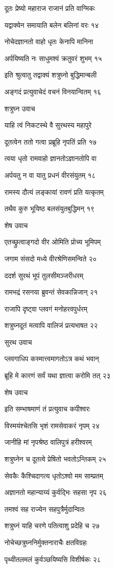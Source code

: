 दूतः प्रेष्यो महाराज राजानं प्रति वाग्मिकः

यद्वाक्येन समायाति बलेन बलिनां वरः १४

नोचेदज्ञानतो वाहो धृतः केनापि मानिना

अर्पयिष्यति नः साधुमश्वं क्रतुवरं शुभम् १५

इति श्रुत्वातु तद्वाक्यं शत्रुघ्नो बुद्धिमान्बली

अङ्गदं प्रत्युवाचेदं वचनं विनयान्वितम् १६

शत्रुघ्न उवाच

याहि त्वं निकटस्थे वै सुरथस्य महापुरे

दूतत्वेन ततो गत्वा प्रब्रूहि नृपतिं प्रति १७

त्वया धृतो रामवाहो ज्ञानतोऽज्ञानतोपि वा

अर्पयतु न वा यातु प्रधनं वीरसंयुतम् १८

रामस्य दौत्यं लङ्कायां रावणं प्रति यत्कृतम्

तथैव कुरु भूयिष्ठ बलसंयुतबुद्धिमन् १९

शेष उवाच

एतच्छ्रुत्वाङ्गदो वीर ओमिति प्रोच्य भूमिपम्

जगाम संसदो मध्ये वीरश्रेणिसमन्विते २०

ददर्श सुरथं भूपं तुलसीमञ्जरीधरम्

रामभद्रं रसनया ब्रुवन्तं सेवकान्निजान् २१

राजापि दृष्ट्वा प्लवगं मनोहरवपुर्धरम्

शत्रुघ्नदूतं मत्वापि वालिजं प्रत्यभाषत २२

सुरथ उवाच

प्लवगाधिप कस्मात्त्वमागतोऽत्र कथं भवान्

ब्रूहि मे कारणं सर्वं यथा ज्ञात्वा करोमि तत् २३

शेष उवाच

इति सम्भाषमाणं तं प्रत्युवाच कपीश्वरः

विस्मयंश्चेतसि भृशं रामसेवाकरं नृपम् २४

जानीहि मां नृपश्रेष्ठ वालिपुत्रं हरीश्वरम्

शत्रुघ्नेन च दूतत्वे प्रेषितो भवतोऽन्तिकम् २५

सेवकैः कैश्चिदागत्य धृतोऽश्वो मम साम्प्रतम्

अज्ञानतो महान्याय्यं कुर्वद्भिः सहसा नृप २६

तमश्वं सह राज्येन सहपुत्रैर्मुदान्वितः

शत्रुघ्नं याहि चरणे पतित्वाशु प्रदेहि च २७

नोचेच्छत्रुघ्ननिर्मुक्तनाराचैः क्षतविग्रहः

पृथ्वीतलमलं कुर्वञ्छयिष्यसि विशीर्षकः २८

